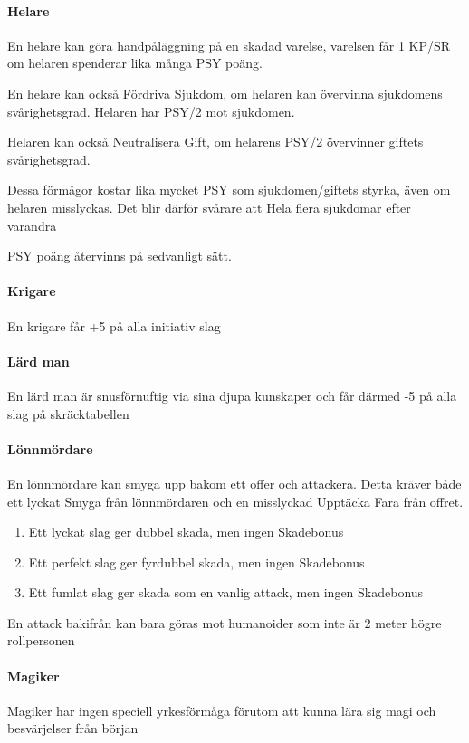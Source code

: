 \documentclass[a4paper, 10pt, titlepage]{article}
\begin{document}
\paragraph{Helare} En helare kan göra handpåläggning på en skadad varelse,
varelsen får 1 KP/SR om helaren spenderar lika många PSY poäng.

En helare kan också Fördriva Sjukdom, om helaren kan övervinna sjukdomens
svårighetsgrad. Helaren har PSY/2 mot sjukdomen.

Helaren kan också Neutralisera Gift, om helarens PSY/2 övervinner giftets svårighetsgrad.

Dessa förmågor kostar lika mycket PSY som sjukdomen/giftets styrka, även om helaren
misslyckas.  Det blir därför svårare att Hela flera sjukdomar efter varandra

PSY poäng återvinns på sedvanligt sätt.


\paragraph{Krigare} En krigare får +5 på alla initiativ slag

\paragraph{Lärd man} En lärd man är snusförnuftig via sina djupa kunskaper och får därmed -5
 på alla slag på skräcktabellen

\paragraph{Lönnmördare} En lönnmördare kan smyga upp bakom ett offer och attackera. Detta kräver
både ett lyckat Smyga från lönnmördaren och en misslyckad Upptäcka Fara från offret.

\begin{enumerate}[x]
  \item Ett lyckat slag ger dubbel skada, men ingen Skadebonus
  \item Ett perfekt slag ger fyrdubbel skada, men ingen Skadebonus
  \item Ett fumlat slag ger skada som en vanlig attack, men ingen Skadebonus
\end{enumerate}

En attack bakifrån kan bara göras mot humanoider som inte är 2 meter högre rollpersonen

\paragraph{Magiker} Magiker har ingen speciell yrkesförmåga förutom att kunna lära sig
magi och besvärjelser från början
\end{document}
